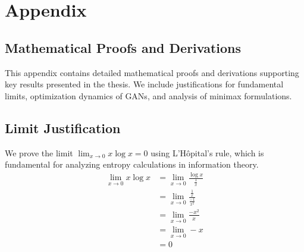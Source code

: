 \section{Appendix}
\subsection{Mathematical Proofs and Derivations}
This appendix contains detailed mathematical proofs and derivations supporting
key results presented in the thesis. We include justifications for fundamental
limits, optimization dynamics of GANs, and analysis of minimax formulations.
\subsection{Limit Justification}
\label{sec:limit-justification}
We prove the limit $\lim_{x \to 0} x\log{x} = 0$ using L'Hôpital's rule, which is fundamental for analyzing entropy calculations in information theory.
\begin{align}
	\label{justification:lhospital}
	\lim_{x \to 0} x\log{x} & = \lim_{x \to 0} \frac{\log x}{\frac{1}{x}}         \\
	                        & = \lim_{x \to 0} \frac{\frac{1}{x}}{\frac{-1}{x^2}} \\
	                        & = \lim_{x \to 0} \frac{-x^2}{x}                     \\
	                        & = \lim_{x \to 0} -x                                 \\
	                        & = 0
\end{align}
